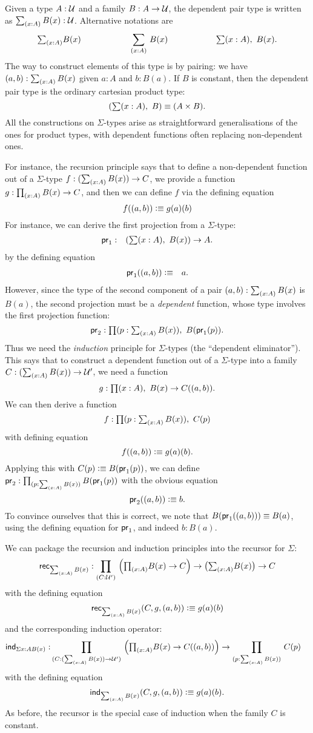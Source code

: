 Given a type $A:\mathcal{U}$ and a family $B : A \to \mathcal{U}$, the dependent
pair type is written as $\sm{x:A} B(x) : \UU$.
Alternative notations are 
\[ \tsm{x:A} B(x) \hspace{2cm} \dsm{x:A}B(x) \hspace{2cm} \lsm{x:A} B(x). \]
The way to construct elements of this type is by pairing: we have
$\tup{a}{b} : \sm{x:A} B(x)$ given $a:A$ and $b:B(a)$.
If $B$ is constant, then the dependent pair type is the
ordinary cartesian product type:
\[ (\sm{x:A} B) \jdeq (A \times B).\]
All the constructions on $\Sigma$-types arise as straightforward generalisations of the ones for product types, with dependent functions often replacing non-dependent ones.

For instance, the recursion principle says that to define a non-dependent function out of a $\Sigma$-type
$f : (\sm{x:A} B(x)) \to C$, we provide a function 
$g : \prd{x:A} B(x) \to C$, and then we can define $f$ via the defining
equation
\[ f(( a,b)) \vcentcolon\equiv g(a)(b) \]
For instance, we can derive the first projection from a $\Sigma$-type:
\begin{eqnarray*}
  \fst & : & (\sm{x : A}B(x)) \to A.
\end{eqnarray*}
by the defining equation
\begin{eqnarray*}
  \mathsf{pr}_{1}(( a,b)) & \vcentcolon\equiv & a.
\end{eqnarray*}
However, since the type of the second component of a pair $(a,b):\sm{x:A} B(x)$ is $B(a)$, the second projection must be a \emph{dependent} function, whose type involves the first projection function:
\[ \snd : \prd{p:\sm{x : A}B(x)}B(\fst(p)). \]
Thus we need the \emph{induction} principle for $\Sigma$-types (the ``dependent eliminator'').
This says that to construct a dependent function out of a $\Sigma$-type into a family $C : (\sm{x:A} B(x)) \to \UU'$, we need a function
\[ g : \prd{x:A} B(x) \to C(\tup{a}{b}). \]
We can then derive a function 
\[ f : \prd{p : \sm{x:A}B(x)} C(p) \]
with  defining equation
\[ f(( a,b)) \vcentcolon\equiv g(a)(b).\]
Applying this with $C(p)\vcentcolon\equiv B(\mathsf{pr}_{1}(p))$, we can define $\snd : \prd{p:\sm{x : A}B(x)}B(\fst(p))$ with the obvious equation
\[ \mathsf{pr}_{2}(( a,b))  \vcentcolon\equiv  b. \]
To convince ourselves that this is correct, we note that $B (\mathsf{pr}_{1}(( a,b))) \equiv B(a)$, using the defining equation for $\mathsf{pr}_{1}$, and
indeed $b : B(a)$.

We can package the recursion and induction principles into the recursor for $\Sigma$:
\[ \rec{\sm{x:A}B(x)} : \dprd{C:\UU'}\Big(\tprd{x:A} B(x) \to C\Big) \to
\big(\tsm{x:A}B(x)\big) \to C \]
with the defining equation
\[ \rec{\sm{x:A}B(x)}(C,g,\tup{a}{b}) \defeq g(a)(b) \]
and the corresponding induction operator:
\begin{align*}
  \ind{\Sigma{x:A}B(x)} : & \dprd{C:(\sm{x:A} B(x)) \to \UU'}
    \Big(\tprd{x:A} B(x) \to C(\tup{a}{b})\Big)
    \to \dprd{p : \sm{x:A}B(x)} C(p)
\end{align*}
with the defining equation 
\[ \ind{\sm{x:A}B(x)}(C,g,\tup{a}{b}) \defeq g(a)(b). \]
As before, the recursor is the special case of induction
when the family $C$ is constant.

